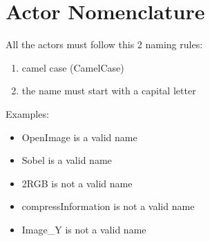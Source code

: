 \section{Actor Nomenclature}

All the actors must follow this 2 naming rules:
\begin{enumerate}
	\item camel case (CamelCase)
	\item the name must start with a capital letter
\end{enumerate}
Examples:
\begin{itemize}
	\item OpenImage is a valid name
	\item Sobel is a valid name
	\item 2RGB is not a valid name
	\item compressInformation  is not a valid name
	\item Image\_Y is not a valid name
\end{itemize}

